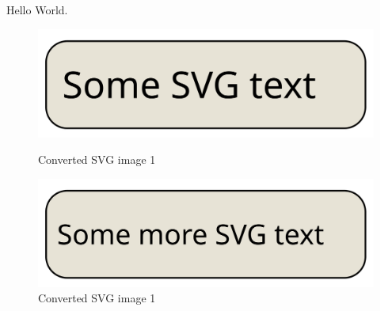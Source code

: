 \documentclass{article}
\begin{document}
Hello World.

\begin{figure}
  \begin{minipage}{.45\linewidth}
    \centering
    \includegraphics[width=\linewidth]{image1}
    \caption{Converted SVG image 1}
  \end{minipage}
  \begin{minipage}{.45\linewidth}
    \centering
    \includegraphics[width=\linewidth]{img/image2}
    \caption{Converted SVG image 1}
  \end{minipage}
\end{figure}
\end{document}
